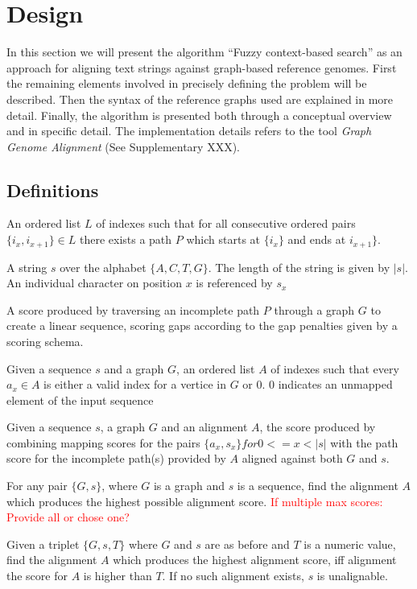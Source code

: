 \documentclass{article}
\begin{document}
\chapter{Design}
In this section we will present the algorithm ``Fuzzy context-based search'' as an approach for aligning text strings against graph-based reference genomes. First the remaining elements involved in precisely defining the problem will be described. Then the syntax of the reference graphs used are explained in more detail. Finally, the algorithm is presented both through a conceptual overview and in specific detail. The implementation details refers to the tool \textit{Graph Genome Alignment} (See Supplementary XXX).
\section{Definitions}
\begin{defn}
  An ordered list $L$ of indexes such that for all consecutive ordered pairs $\{i_x, i_{x+1}\} \in L$ there exists a path $P$ which starts at $\{i_x\}$ and ends at $i_{x+1}\}$.
\end{defn}
\begin{defn}
  A string $s$ over the alphabet $\{A, C, T, G\}$. The length of the string is given by $|s|$. An individual character on position $x$ is referenced by $s_x$
\end{defn}
\begin{defn}
  A score produced by traversing an incomplete path $P$ through a graph $G$ to create a linear sequence, scoring gaps according to the gap penalties given by a scoring schema.
\end{defn}
\begin{defn}[Alignment]
  Given a sequence $s$ and a graph $G$, an ordered list $A$ of indexes such that every $a_x \in A$ is either a valid index for a vertice in $G$ or $0$. $0$ indicates an unmapped element of the input sequence
\end{defn}
\begin{defn}
  Given a sequence $s$, a graph $G$ and an alignment $A$, the score produced by combining mapping scores for the pairs $\{a_x, s_x\} for 0<=x<|s|$ with the path score for the incomplete path(s) provided by $A$ aligned against both $G$ and $s$.
\end{defn}
\begin{defn}
  For any pair $\{G, s\}$, where $G$ is a graph and $s$ is a sequence, find the alignment $A$ which produces the highest possible alignment score.
  \textcolor{red}{If multiple max scores: Provide all or chose one?}
\end{defn}
\begin{defn}
  Given a triplet $\{G, s, T\}$ where $G$ and $s$ are as before and $T$ is a numeric value, find the alignment $A$ which produces the highest alignment score, iff alignment the score for $A$ is higher than $T$. If no such alignment exists, $s$ is unalignable.
\end{defn}
\end{document}
